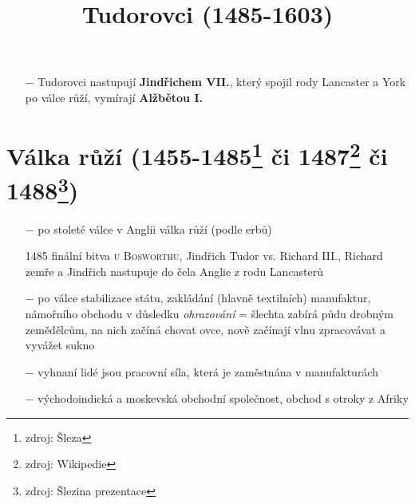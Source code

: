 \documentclass{article}
\title{\vspace{-2cm}Tudorovci (1485-1603)\vspace{-1.7cm}}
\date{}
\author{}
\begin{document}
\maketitle

\begin{itemize}
    \vspace{-0.5em}
    \setlength\itemsep{0.15em}
    \item[$-$] Tudorovci nastupují \textbf{Jindřichem VII.}, který spojil rody Lancaster a York po válce růží, vymírají \textbf{Alžbětou I.}
\end{itemize}

\section*{Válka růží (1455-1485\footnote{zdroj: Šleza} či 1487\footnote{zdroj: Wikipedie} či 1488\footnote{zdroj: Šlezina prezentace})}
\begin{itemize}
    \vspace{-0.5em}
    \setlength\itemsep{0.15em}
    \item[$-$] po stoleté válce v Anglii válka růží (podle erbů)
    \item[1485] finální bitva \textsc{u Bosworthu}, Jindřich Tudor vs. Richard III., Richard zemře a Jindřich nastupuje do čela Anglie z rodu Lancasterů
    \item[$-$] po válce stabilizace státu, zakládání (hlavně textilních) manufaktur, námořního obchodu v důsledku \textit{ohrazování} = šlechta zabírá půdu drobným zemědělcům, na nich začíná chovat ovce, nově začínají vlnu zpracovávat a vyvážet sukno
    \item[$-$] vyhnaní lidé jsou pracovní síla, která je zaměstnána v manufakturách
    \item[$-$] východoindická a moskevská obchodní společnost, obchod s otroky z Afriky
\end{itemize}
\end{document}
